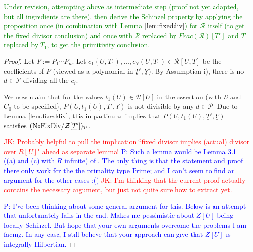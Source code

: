 \documentclass[11pt,a4paper,reqno]{amsart}
\theoremstyle{definition}
\begin{document}
\textcolor{green}{Under revision, attempting above as intermediate step (proof not yet adapted, but all ingredients are there), then derive the Schinzel property by applying the proposition once (in combination with Lemma \ref{lem:fixeddiv}) for $\mathcal{R}$ itself (to get the fixed divisor conclusion) and once with $\mathcal{R}$ replaced by $Frac(\mathcal{R})[\underline{T}']$ and $\underline{T}$ replaced by $T_1$, to get the primitivity conclusion.}



\begin{proof}
Let $P:=P_1\cdots P_n$.  Let $c_1(U,T_1),\dots, c_N(U,T_1)\in \mathcal R[U,T]$ be the coefficients of $P$ (viewed as a polynomial in $\underline {T}', \underline Y$). By Assumption i), there is no $d\in \mathcal P$ 
dividing all the $c_i$. 

\iffalse
We now claim that for the values $t_1(U)\in \mathcal R[U]$  in the assertion (with $S$ and $C_0$ to be specified),  $P(U,t_1(U),\underline T', \underline Y)$ is not divisible by any $d\in \mathcal P$. Due to Lemma \ref{lem:fixeddiv}, this in particular implies that $P(U,t_1(U), \underline{T}', \underline{Y})$ satisfies $\hbox{\rm (NoFixDiv}/{\mathcal Z}[\underline T^\prime])_{\mathcal P}$.

\iffalse
\textcolor{red}{JK: Probably helpful to pull the implication ``fixed divisor implies (actual) divisor over $R[U]$" ahead as separate lemma!}
\textcolor{blue}{P: Such a lemma would be Lemma 3.1 ((a) and (c) with $R$ infinite) of \cite{BDKN22}. The only thing is that the statement and proof there only work for the the primality type Prime; and I can't seem to find an argument for the other cases :(( }
\textcolor{red}{JK: I'm thinking that the current proof actually contains the necessary argument, but just not quite sure how to extract yet.}

\textcolor{blue}{P: I've been thinking about some general argument for this. Below is an attempt that unfortunately fails in the end. Makes me pessimistic about $Z[U]$ being locally Schinzel. But hope that your own arguments overcome the problems I am facing.  In any case, I still believe that your approach can give that $Z[U]$ is integrally Hilbertian.}


\end{proof}
\end{document}
